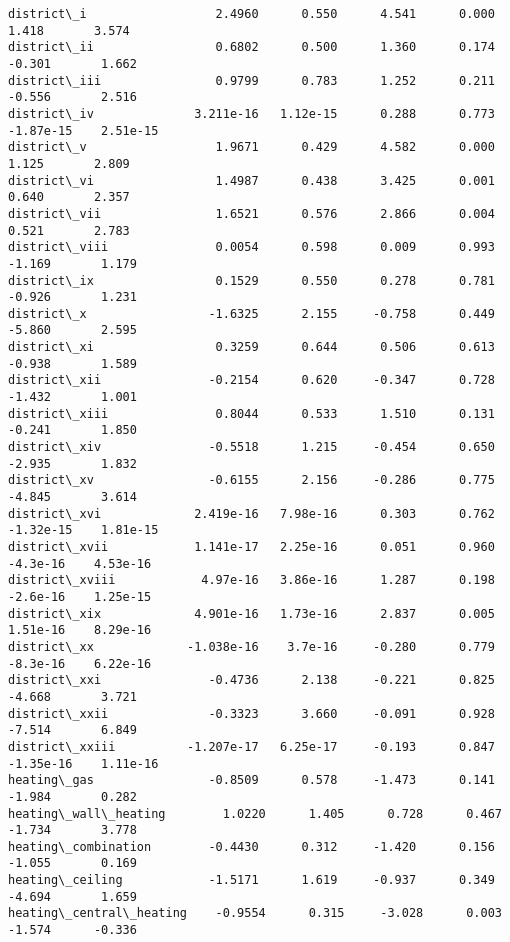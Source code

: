 \documentclass[11pt]{article}
\begin{document}
\begin{Verbatim}[commandchars=\\\{\}]
district\_i                  2.4960      0.550      4.541      0.000       1.418       3.574
district\_ii                 0.6802      0.500      1.360      0.174      -0.301       1.662
district\_iii                0.9799      0.783      1.252      0.211      -0.556       2.516
district\_iv              3.211e-16   1.12e-15      0.288      0.773   -1.87e-15    2.51e-15
district\_v                  1.9671      0.429      4.582      0.000       1.125       2.809
district\_vi                 1.4987      0.438      3.425      0.001       0.640       2.357
district\_vii                1.6521      0.576      2.866      0.004       0.521       2.783
district\_viii               0.0054      0.598      0.009      0.993      -1.169       1.179
district\_ix                 0.1529      0.550      0.278      0.781      -0.926       1.231
district\_x                 -1.6325      2.155     -0.758      0.449      -5.860       2.595
district\_xi                 0.3259      0.644      0.506      0.613      -0.938       1.589
district\_xii               -0.2154      0.620     -0.347      0.728      -1.432       1.001
district\_xiii               0.8044      0.533      1.510      0.131      -0.241       1.850
district\_xiv               -0.5518      1.215     -0.454      0.650      -2.935       1.832
district\_xv                -0.6155      2.156     -0.286      0.775      -4.845       3.614
district\_xvi             2.419e-16   7.98e-16      0.303      0.762   -1.32e-15    1.81e-15
district\_xvii            1.141e-17   2.25e-16      0.051      0.960    -4.3e-16    4.53e-16
district\_xviii            4.97e-16   3.86e-16      1.287      0.198    -2.6e-16    1.25e-15
district\_xix             4.901e-16   1.73e-16      2.837      0.005    1.51e-16    8.29e-16
district\_xx             -1.038e-16    3.7e-16     -0.280      0.779    -8.3e-16    6.22e-16
district\_xxi               -0.4736      2.138     -0.221      0.825      -4.668       3.721
district\_xxii              -0.3323      3.660     -0.091      0.928      -7.514       6.849
district\_xxiii          -1.207e-17   6.25e-17     -0.193      0.847   -1.35e-16    1.11e-16
heating\_gas                -0.8509      0.578     -1.473      0.141      -1.984       0.282
heating\_wall\_heating        1.0220      1.405      0.728      0.467      -1.734       3.778
heating\_combination        -0.4430      0.312     -1.420      0.156      -1.055       0.169
heating\_ceiling            -1.5171      1.619     -0.937      0.349      -4.694       1.659
heating\_central\_heating    -0.9554      0.315     -3.028      0.003      -1.574      -0.336

\end{Verbatim}
\end{document}
